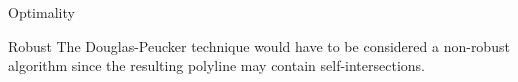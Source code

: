 \documentclass[10pt]{beamer}
\begin{document}
\begin{frame}{Optimality}
\begin{figure}[h]
\begin{minipage}[h]{0.49\linewidth}
		\end{minipage}
	\end{figure}
\end{frame}
	
\begin{frame}{Robust}
	The Douglas-Peucker technique would have to be considered a non-robust algorithm
	since the resulting polyline may contain self-intersections.
	\begin{figure}[h]
	\end{figure}
\end{frame}
\end{document}
